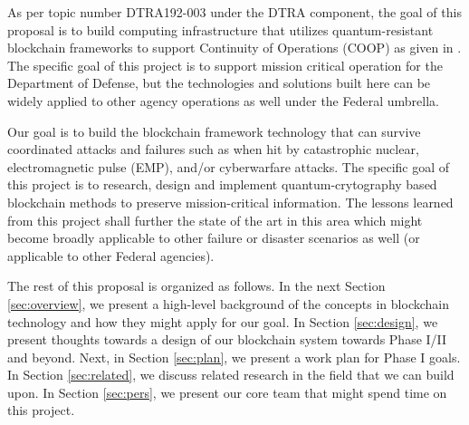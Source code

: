 As per topic number DTRA192-003 under the DTRA component, the goal of this proposal is to build computing infrastructure
that utilizes quantum-resistant blockchain frameworks to support Continuity of Operations (COOP) as given in
\cite{nistreport}. The specific goal of this project is to support mission critical operation for the Department of
Defense, but the technologies and solutions built here can be widely applied to other agency operations as well under
the Federal umbrella. 

Our goal is to build the blockchain framework technology that can survive coordinated attacks and failures such as when
hit by catastrophic nuclear, electromagnetic pulse (EMP), and/or cyberwarfare attacks. The specific goal of this project
is to research, design and implement quantum-crytography based blockchain methods to preserve mission-critical
information. The lessons learned from this project shall further the state of the art in this area which might become
broadly applicable to other failure or disaster scenarios as well (or applicable to other Federal agencies).

The rest of this proposal is organized as follows. In the next Section \ref{sec:overview}, we present a high-level
background of the concepts in blockchain technology and how they might apply for our goal. In Section \ref{sec:design},
we present thoughts towards a design of our blockchain system towards Phase I/II and beyond. Next, in Section
\ref{sec:plan}, we present a work plan for Phase I goals. In Section \ref{sec:related}, we discuss related research in 
the field that we can build upon. In Section \ref{sec:pers}, we present our core team that might spend time on this
project.

